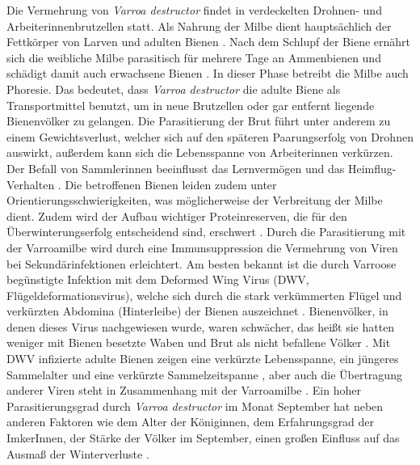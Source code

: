 Die Vermehrung von \textit{Varroa destructor} findet in verdeckelten Drohnen- und Arbeiterinnenbrutzellen statt. Als Nahrung der Milbe dient hauptsächlich der Fettkörper von Larven und adulten Bienen \citep{ramsey2019}. Nach dem Schlupf der Biene ernährt sich die weibliche Milbe parasitisch für mehrere Tage an Ammenbienen und schädigt damit auch erwachsene Bienen \citep{ramsey2019}. In dieser Phase betreibt die Milbe auch Phoresie. Das bedeutet, dass \textit{Varroa destructor} die adulte Biene als Transportmittel benutzt, um in neue Brutzellen oder gar entfernt liegende Bienenvölker zu gelangen. Die Parasitierung der Brut führt unter anderem zu einem Gewichtsverlust, welcher sich auf den späteren Paarungserfolg von Drohnen auswirkt, außerdem kann sich die Lebensspanne von Arbeiterinnen verkürzen. Der Befall von Sammlerinnen beeinflusst das Lernvermögen und das Heimflug-Verhalten \citep{kralj2007, kralj2006, rosenkranz2010, noel2020}. Die betroffenen Bienen leiden zudem unter Orientierungsschwierigkeiten, was möglicherweise der Verbreitung der Milbe dient. Zudem wird der Aufbau wichtiger Proteinreserven, die für den Überwinterungserfolg entscheidend sind, erschwert \citep{amdam2004}. Durch die Parasitierung mit der Varroamilbe wird durch eine Immunsuppression die Vermehrung von Viren bei Sekundärinfektionen erleichtert. Am besten bekannt ist die durch Varroose begünstigte Infektion mit dem Deformed Wing Virus (DWV, Flügeldeformationsvirus), welche sich durch die stark verkümmerten Flügel und verkürzten Abdomina (Hinterleibe) der Bienen auszeichnet \citep{rosenkranz2010}. Bienenvölker, in denen dieses Virus nachgewiesen wurde, waren schwächer, das heißt sie hatten weniger mit Bienen besetzte Waben und Brut als nicht befallene Völker \citep{budge2015}. Mit DWV infizierte adulte Bienen zeigen eine verkürzte Lebensspanne, ein jüngeres Sammelalter und eine verkürzte Sammelzeitspanne \citep{benaets2017}, aber auch die Übertragung anderer Viren steht in Zusammenhang mit der Varroamilbe \citep{traynor2016}. Ein hoher Parasitierungsgrad durch \textit{Varroa destructor} im Monat September hat neben anderen Faktoren wie dem Alter der Königinnen, dem Erfahrungsgrad der ImkerInnen, der Stärke der Völker im September, einen großen Einfluss auf das Ausmaß der Winterverluste \citep{morawetz2019}.
\newline

